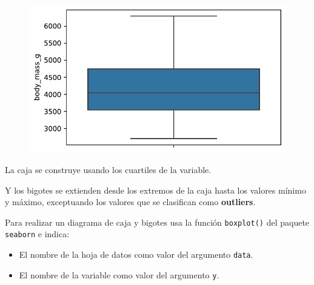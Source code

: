 \documentclass[
  a4paper,
  noprof,
  12pt,
  notoc,
  nosols,
  nobib]{mnye}
\providecommand{\tightlist}{%
  \setlength{\itemsep}{0pt}\setlength{\parskip}{0pt}}\usepackage{longtable,booktabs,array}
\theoremstyle{definition}
\theoremstyle{remark}
\begin{document}
\begin{figure}[tbph]

{\centering \includegraphics{chapters/1numerical_files/figure-pdf/cell-6-output-1.pdf}

}

\end{figure}

La caja se construye usando los cuartiles de la variable.

Y los bigotes se extienden desde los extremos de la caja hasta los
valores mínimo y máximo, exceptuando los valores que se clasifican como
\textbf{outliers}.

\begin{tcolorbox}[enhanced jigsaw, arc=.35mm, colback=white, colframe=quarto-callout-note-color-frame, breakable, opacityback=0, bottomrule=.15mm, rightrule=.15mm, left=2mm, toprule=.15mm, leftrule=.75mm]
\begin{minipage}[t]{5.5mm}
\textcolor{quarto-callout-note-color}{\faInfo}
\end{minipage}%
\begin{minipage}[t]{\textwidth - 5.5mm}

Para realizar un diagrama de caja y bigotes usa la función
\texttt{boxplot()} del paquete \texttt{seaborn} e indica:

\begin{itemize}
\tightlist
\item
  El nombre de la hoja de datos como valor del argumento \texttt{data}.
\item
  El nombre de la variable como valor del argumento \texttt{y}.
\end{itemize}

\end{minipage}%
\end{tcolorbox}
\end{document}
